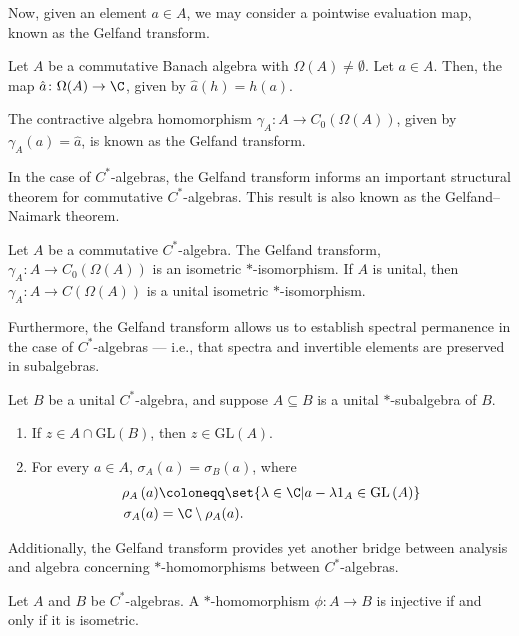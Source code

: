 Now, given an element $a\in A$, we may consider a pointwise evaluation map, known as the Gelfand transform.
\begin{definition}\label{def:gelfand_transform}
  Let $A$ be a commutative Banach algebra with $\Omega(A)\neq \emptyset$. Let $a\in A$. Then, the map $\hat{a}\colon \Omega(A)\rightarrow \C$, given by $\hat{a}(h) = h(a)$. \newline

  The contractive algebra homomorphism $\gamma_A\colon A\rightarrow C_0\left( \Omega\left( A \right) \right)$, given by $\gamma_A(a) = \hat{a}$, is known as the Gelfand transform.
\end{definition}
In the case of $C^{\ast}$-algebras, the Gelfand transform informs an important structural theorem for commutative $C^{\ast}$-algebras. This result is also known as the Gelfand--Naimark theorem.
\begin{theorem}\label{thm:gelfand_naimark}
  Let $A$ be a commutative $C^{\ast}$-algebra. The Gelfand transform, $\gamma_A\colon A\rightarrow C_0\left( \Omega\left( A \right) \right)$ is an isometric $\ast$-isomorphism. If $A$ is unital, then $\gamma_A\colon A\rightarrow C\left( \Omega\left( A \right) \right)$ is a unital isometric $\ast$-isomorphism.
\end{theorem}
Furthermore, the Gelfand transform allows us to establish spectral permanence in the case of $C^{\ast}$-algebras --- i.e., that spectra and invertible elements are preserved in subalgebras.
\begin{proposition}
  Let $B$ be a unital $C^{\ast}$-algebra, and suppose $A\subseteq B$ is a unital $\ast$-subalgebra of $B$.
  \begin{enumerate}[(1)]
    \item If $z\in A\cap \text{GL}\left( B \right)$, then $z\in \text{GL}\left( A \right)$.
    \item For every $a\in A$, $\sigma_{A}(a) = \sigma_B(a)$, where 
      \begin{align*}
        \rho_A\left( a \right) &\coloneq \set{\lambda\in \C | a - \lambda 1_A \in \text{GL}\left( A \right)}\\
        \sigma_A(a) &= \C\setminus \rho_A(a).
      \end{align*}
  \end{enumerate}
\end{proposition}
Additionally, the Gelfand transform provides yet another bridge between analysis and algebra concerning $\ast$-homomorphisms between $C^{\ast}$-algebras.
\begin{proposition}\label{thm:cstar_homomorphism_isometric_injective}
  Let $A$ and $B$ be $C^{\ast}$-algebras. A $\ast$-homomorphism $\phi\colon A\rightarrow B$ is injective if and only if it is isometric.
\end{proposition}
